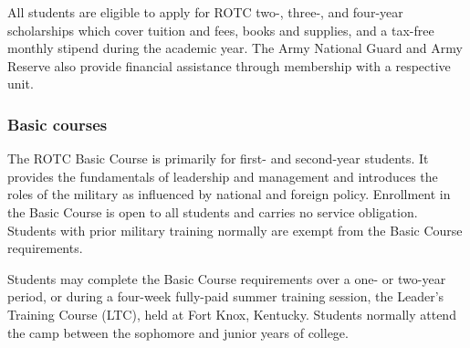 \documentclass[
  letterpaper,
]{scrbook}
\begin{document}
All students are eligible to apply for ROTC two-, three-, and four-year
scholarships which cover tuition and fees, books and supplies, and a
tax-free monthly stipend during the academic year. The Army National
Guard and Army Reserve also provide financial assistance through
membership with a respective unit.

\hypertarget{basic-courses}{%
\subsubsection*{Basic courses}\label{basic-courses}}

The ROTC Basic Course is primarily for first- and second-year students.
It provides the fundamentals of leadership and management and introduces
the roles of the military as influenced by national and foreign policy.
Enrollment in the Basic Course is open to all students and carries no
service obligation. Students with prior military training normally are
exempt from the Basic Course requirements.

Students may complete the Basic Course requirements over a one- or
two-year period, or during a four-week fully-paid summer training
session, the Leader's Training Course (LTC), held at Fort Knox,
Kentucky. Students normally attend the camp between the sophomore and
junior years of college.
\end{document}
